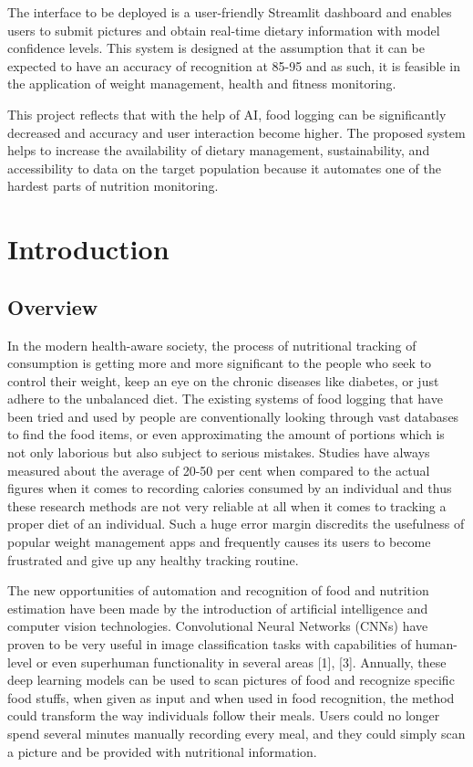 \documentclass[12pt, openany]{report}
\newcommand*{\BeginNoToc}{%
  \addtocontents{toc}{%
    \edef\protect\SavedTocDepth{\protect\the\protect\value{tocdepth}}%
  }%
  \addtocontents{toc}{%
    \protect\setcounter{tocdepth}{-10}%
  }%
}
\newcommand*{\EndNoToc}{%
  \addtocontents{toc}{%
    \protect\setcounter{tocdepth}{\protect\SavedTocDepth}%
  }%
}
\begin{document}
The interface to be deployed is a user-friendly Streamlit dashboard and enables users to submit pictures and obtain real-time dietary information with model confidence levels. This system is designed at the assumption that it can be expected to have an accuracy of recognition at 85-95 and as such, it is feasible in the application of weight management, health and fitness monitoring.

This project reflects that with the help of AI, food logging can be significantly decreased and accuracy and user interaction become higher. The proposed system helps to increase the availability of dietary management, sustainability, and accessibility to data on the target population because it automates one of the hardest parts of nutrition monitoring.

\tableofcontents{}
\BeginNoToc 
\listoffigures
\listoftables
\EndNoToc 

\chapter{Introduction}

\section{Overview}
In the modern health-aware society, the process of nutritional tracking of consumption is getting more and more significant to the people who seek to control their weight, keep an eye on the chronic diseases like diabetes, or just adhere to the unbalanced diet. The existing systems of food logging that have been tried and used by people are conventionally looking through vast databases to find the food items, or even approximating the amount of portions which is not only laborious but also subject to serious mistakes. Studies have always measured about the average of 20-50 per cent when compared to the actual figures when it comes to recording calories consumed by an individual and thus these research methods are not very reliable at all when it comes to tracking a proper diet of an individual. Such a huge error margin discredits the usefulness of popular weight management apps and frequently causes its users to become frustrated and give up any healthy tracking routine.

The new opportunities of automation and recognition of food and nutrition estimation have been made by the introduction of artificial intelligence and computer vision technologies. Convolutional Neural Networks (CNNs) have proven to be very useful in image classification tasks with capabilities of human-level or even superhuman functionality in several areas [1], [3]. Annually, these deep learning models can be used to scan pictures of food and recognize specific food stuffs, when given as input and when used in food recognition, the method could transform the way individuals follow their meals. Users could no longer spend several minutes manually recording every meal, and they could simply scan a picture and be provided with nutritional information.
\end{document}
